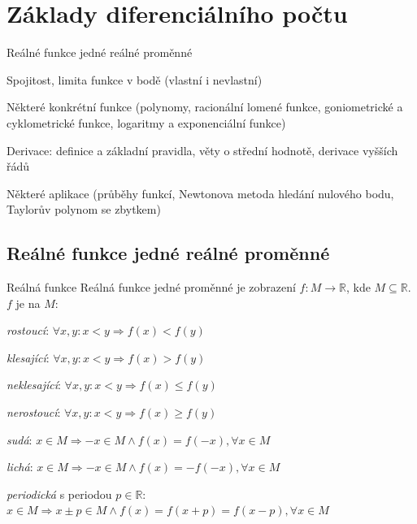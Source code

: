 \def\tg{\mathrm{tg}}
\def\cotg{\mathrm{cotg}}
\def\arctg{\mathrm{arctg}}
\def\arccotg{\mathrm{arccotg}}

\section{Základy diferenciálního počtu}

\begin{pozadavky}
\begin{pitemize}
	\item Reálné funkce jedné reálné proměnné
	\item Spojitost, limita funkce v bodě (vlastní i nevlastní)
	\item Některé konkrétní funkce (polynomy, racionální lomené funkce, goniometrické a cyklometrické funkce, logaritmy a exponenciální funkce)
	\item Derivace: definice a základní pravidla, věty o střední hodnotě, derivace vyšších řádů
	\item Některé aplikace (průběhy funkcí, Newtonova metoda hledání nulového bodu, Taylorův polynom se zbytkem)
\end{pitemize}
\end{pozadavky}

\subsection{Reálné funkce jedné reálné proměnné}
\begin{definiceN}{Reálná funkce}
Reálná funkce jedné proměnné je zobrazení $f: M \rightarrow \mathbb{R}$, kde $M \subseteq \mathbb{R}$. \\
$f$ je na $M$:
\begin{pitemize}
	\item \emph{rostoucí}: $\forall x, y: x < y \Rightarrow f(x) < f(y)$
	\item \emph{klesající}: $\forall x, y: x < y \Rightarrow f(x) > f(y)$
	\item \emph{neklesající}: $\forall x, y: x < y \Rightarrow f(x) \le f(y)$
	\item \emph{nerostoucí}: $\forall x, y: x < y \Rightarrow f(x) \ge f(y)$

	\item \emph{sudá}: $x \in M \Rightarrow -x \in M \wedge f(x)=f(-x), \forall x \in M$
	\item \emph{lichá}: $x \in M \Rightarrow -x \in M \wedge f(x)=-f(-x), \forall x \in M$
	\item \emph{periodická} s periodou $p\in\mathbb{R}$: $x \in M \Rightarrow x \pm p \in M \wedge f(x)=f(x+p)=f(x-p), \forall x \in M$
\end{pitemize}
\end{definiceN}


